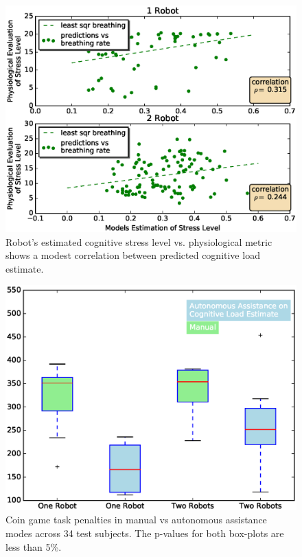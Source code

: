 \documentclass{sig-alternate}
\begin{document}
\begin{figure}  
\centering
\includegraphics[width=.5\textwidth]{prediction_vs_b_p_2.eps}
\caption{ Robot's estimated cognitive stress level vs. physiological metric shows a modest correlation between predicted
cognitive load estimate. }
\label{fig:pred_phy}
\end{figure}

\begin{figure}
\centering
\includegraphics[width=.5\textwidth]{BoxWiskerTimesCompMaualVsAuto2.eps}
\caption{Coin game task penalties in manual vs autonomous assistance modes across 34 test subjects. The p-values for both box-plots are less than 5\%.}
\label{fig:BoxWiskersTimeComp}
\end{figure}

\end{document}
